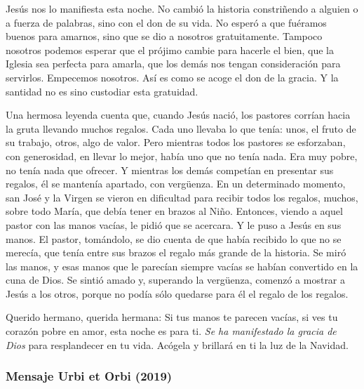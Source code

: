 \begin{body}
	Jesús nos lo manifiesta esta noche. No cambió la historia constriñendo a alguien o a fuerza de palabras, sino con el don de su vida. No esperó a que fuéramos buenos para amarnos, sino que se dio a nosotros gratuitamente. Tampoco nosotros podemos esperar que el prójimo cambie para hacerle el bien, que la Iglesia sea perfecta para amarla, que los demás nos tengan consideración para servirlos. Empecemos nosotros. Así es como se acoge el don de la gracia. Y la santidad no es sino custodiar esta gratuidad.
	
	Una hermosa leyenda cuenta que, cuando Jesús nació, los pastores corrían hacia la gruta llevando muchos regalos. Cada uno llevaba lo que tenía: unos, el fruto de su trabajo, otros, algo de valor. Pero mientras todos los pastores se esforzaban, con generosidad, en llevar lo mejor, había uno que no tenía nada. Era muy pobre, no tenía nada que ofrecer. Y mientras los demás competían en presentar sus regalos, él se mantenía apartado, con vergüenza. En un determinado momento, san José y la Virgen se vieron en dificultad para recibir todos los regalos, muchos, sobre todo María, que debía tener en brazos al Niño. Entonces, viendo a aquel pastor con las manos vacías, le pidió que se acercara. Y le puso a Jesús en sus manos. El pastor, tomándolo, se dio cuenta de que había recibido lo que no se merecía, que tenía entre sus brazos el regalo más grande de la historia. Se miró las manos, y esas manos que le parecían siempre vacías se habían convertido en la cuna de Dios. Se sintió amado y, superando la vergüenza, comenzó a mostrar a Jesús a los otros, porque no podía sólo quedarse para él el regalo de los regalos.
	
	Querido hermano, querida hermana: Si tus manos te parecen vacías, si ves tu corazón pobre en amor, esta noche es para ti. \emph{Se ha manifestado la gracia de Dios} para resplandecer en tu vida. Acógela y brillará en ti la luz de la Navidad.
\end{body}

\subsubsection{Mensaje Urbi et Orbi (2019)} 


